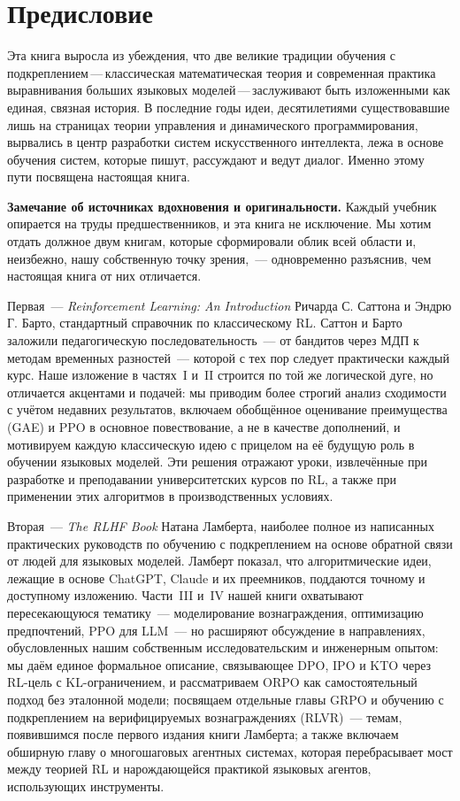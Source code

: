 \chapter*{Предисловие}

Эта книга выросла из убеждения, что две великие традиции обучения с подкреплением\,---\,классическая математическая теория и современная практика выравнивания больших языковых моделей\,---\,заслуживают быть изложенными как единая, связная история. В последние годы идеи, десятилетиями существовавшие лишь на страницах теории управления и динамического программирования, вырвались в центр разработки систем искусственного интеллекта, лежа в основе обучения систем, которые пишут, рассуждают и ведут диалог. Именно этому пути посвящена настоящая книга.

\medskip

\textbf{Замечание об источниках вдохновения и оригинальности.}\quad
Каждый учебник опирается на труды предшественников, и эта книга не исключение. Мы хотим отдать должное двум книгам, которые сформировали облик всей области и, неизбежно, нашу собственную точку зрения,~--- одновременно разъяснив, чем настоящая книга от них отличается.

Первая~--- \emph{Reinforcement Learning: An Introduction} Ричарда С. Саттона и Эндрю Г. Барто, стандартный справочник по классическому RL\@. Саттон и Барто заложили педагогическую последовательность~--- от бандитов через МДП к методам временных разностей~--- которой с тех пор следует практически каждый курс. Наше изложение в частях~I и~II строится по той же логической дуге, но отличается акцентами и подачей: мы приводим более строгий анализ сходимости с учётом недавних результатов, включаем обобщённое оценивание преимущества (GAE) и PPO в основное повествование, а не в качестве дополнений, и мотивируем каждую классическую идею с прицелом на её будущую роль в обучении языковых моделей. Эти решения отражают уроки, извлечённые при разработке и преподавании университетских курсов по RL, а также при применении этих алгоритмов в производственных условиях.

Вторая~--- \emph{The RLHF Book} Натана Ламберта, наиболее полное из написанных практических руководств по обучению с подкреплением на основе обратной связи от людей для языковых моделей. Ламберт показал, что алгоритмические идеи, лежащие в основе ChatGPT, Claude и их преемников, поддаются точному и доступному изложению. Части~III и~IV нашей книги охватывают пересекающуюся тематику~--- моделирование вознаграждения, оптимизацию предпочтений, PPO для LLM~--- но расширяют обсуждение в направлениях, обусловленных нашим собственным исследовательским и инженерным опытом: мы даём единое формальное описание, связывающее DPO, IPO и KTO через RL-цель с KL-ограничением, и рассматриваем ORPO как самостоятельный подход без эталонной модели; посвящаем отдельные главы GRPO и обучению с подкреплением на верифицируемых вознаграждениях (RLVR)~--- темам, появившимся после первого издания книги Ламберта; а также включаем обширную главу о многошаговых агентных системах, которая перебрасывает мост между теорией RL и нарождающейся практикой языковых агентов, использующих инструменты.

